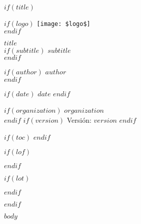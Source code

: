 \documentclass[11pt,a4paper]{article}
\begin{document}
$if(title)$
\begin{titlepage}
    \centering
    \vspace*{2cm}
    
    $if(logo)$
    \texttt{[image: \$logo\$]}\\[2cm]
    $endif$
    
    {\Huge \textbf{$title$}}\\[1.5em]
    
    $if(subtitle)$
    {\Large $subtitle$}\\[1em]
    $endif$
    
    $if(author)$
    {\large \textit{$author$}}\\[0.5em]
    $endif$
    
    $if(date)$
    {\normalsize $date$}
    $endif$
    
    \vfill
    
    $if(organization)$
    {\small $organization$}\\
    $endif$
    $if(version)$
    {\small Versión: $version$}
    $endif$
    
\end{titlepage}

$if(toc)$
\tableofcontents
\newpage
$endif$

$if(lof)$
\listoffigures
\newpage
$endif$

$if(lot)$
\listoftables
\newpage
$endif$

$endif$

$body$
\end{document}
